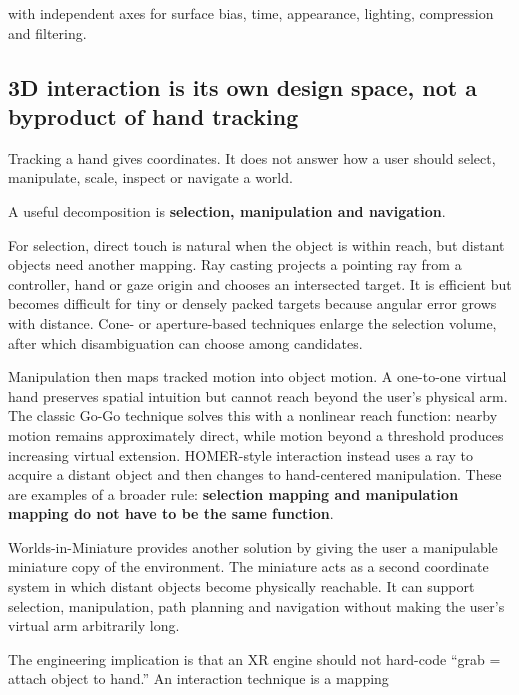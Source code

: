 with independent axes for surface bias, time, appearance, lighting, compression and filtering.

\subsection{3D interaction is its own design space, not a byproduct of hand tracking}\label{04-visual-computing-ii-ch035-d-interaction-is-its-own-design-space-not-a-byproduct-of-hand-tracking}

\hypertarget{04-visual-computing-ii-ch035-d-interaction-is-its-own-design-space-not-a-byproduct-of-hand-tracking}{}

Tracking a hand gives coordinates. It does not answer how a user should select, manipulate, scale, inspect or navigate a world.

A useful decomposition is \textbf{selection, manipulation and navigation}.

For selection, direct touch is natural when the object is within reach, but distant objects need another mapping. Ray casting projects a pointing ray from a controller, hand or gaze origin and chooses an intersected target. It is efficient but becomes difficult for tiny or densely packed targets because angular error grows with distance. Cone- or aperture-based techniques enlarge the selection volume, after which disambiguation can choose among candidates.

Manipulation then maps tracked motion into object motion. A one-to-one virtual hand preserves spatial intuition but cannot reach beyond the user's physical arm. The classic Go-Go technique solves this with a nonlinear reach function: nearby motion remains approximately direct, while motion beyond a threshold produces increasing virtual extension. HOMER-style interaction instead uses a ray to acquire a distant object and then changes to hand-centered manipulation. These are examples of a broader rule: \textbf{selection mapping and manipulation mapping do not have to be the same function}.

Worlds-in-Miniature provides another solution by giving the user a manipulable miniature copy of the environment. The miniature acts as a second coordinate system in which distant objects become physically reachable. It can support selection, manipulation, path planning and navigation without making the user's virtual arm arbitrarily long.

The engineering implication is that an XR engine should not hard-code ``grab = attach object to hand.'' An interaction technique is a mapping

